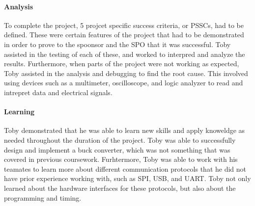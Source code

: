 \documentclass[../../main.tex]{subfiles}
\begin{document}
\paragraph{Analysis}
\par To complete the project, 5 projcet specific success criteria, or PSSCs, had to be defined. These were certain features of the project that had to be demonstrated in order to prove to the spoonsor and the SPO that it was successful. Toby assisted in the testing of each of these, and worked to interpred and analyze the results. Furthermore, when parts of the project were not working as expected, Toby assisted in the analysis and debugging to find the root cause. This involved using devices such as a multimeter, oscilloscope, and logic analyzer to read and intrepret data and electrical signals. 

\paragraph{Learning}
\par Toby demonstrated that he was able to learn new skills and apply knoweldge as needed throughout the duration of the project. Toby was able to successfully design and implement a buck converter, which was not something that was covered in previous coursework. Furhtermore, Toby was able to work with his teamates to learn more about different communication protocols that he did not have prior experience working with, such as SPI, USB, and UART. Toby not only learned about the hardware interfaces for these protocols, but also about the programming and timing.
\end{document}
